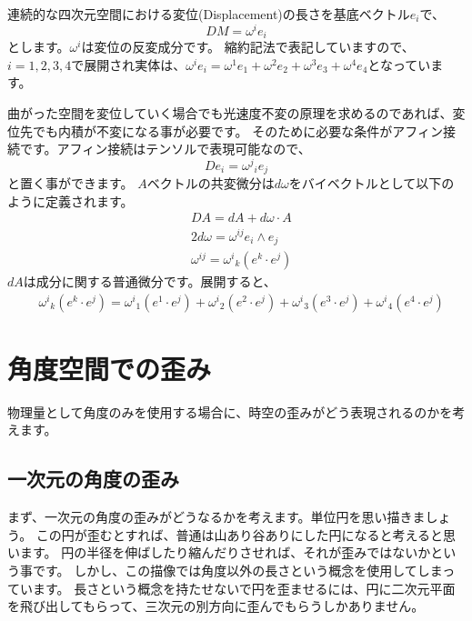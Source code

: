 \documentclass[a4paper,12pt,notitlepage]{jsreport}
\begin{document}
連続的な四次元空間における変位(Displacement)の長さを基底ベクトル$e_i$で、
\begin{equation}
  DM=\omega^ie_i
\end{equation}
とします。$\omega^i$は変位の反変成分です。
縮約記法で表記していますので、$i=1,2,3,4$で展開され実体は、$\omega^ie_i=\omega^1e_1+\omega^2e_2+\omega^3e_3+\omega^4e_4$となっています。

曲がった空間を変位していく場合でも光速度不変の原理を求めるのであれば、変位先でも内積が不変になる事が必要です。
そのために必要な条件がアフィン接続です。アフィン接続はテンソルで表現可能なので、
\begin{equation}
  De_i={\omega^j}_ie_j
\end{equation}
と置く事ができます。
$A$ベクトルの共変微分は$d\omega$をバイベクトルとして以下のように定義されます。
\begin{equation}
  \begin{split}
    &DA=dA+d\omega\cdot A\\
    &2d\omega=\omega^{ij}e_i\wedge e_j\\
    &\omega^{ij}={\omega^i}_k(e^k\cdot e^j)
  \end{split}
\end{equation}
$dA$は成分に関する普通微分です。展開すると、
\begin{equation}
  \begin{split}
    &{\omega^i}_k(e^k\cdot e^j)={\omega^i}_1(e^1\cdot e^j)+{\omega^i}_2(e^2\cdot e^j)+{\omega^i}_3(e^3\cdot e^j)+{\omega^i}_4(e^4\cdot e^j)
  \end{split}
\end{equation}



\chapter{角度空間での歪み}

物理量として角度のみを使用する場合に、時空の歪みがどう表現されるのかを考えます。

\section{一次元の角度の歪み}

まず、一次元の角度の歪みがどうなるかを考えます。単位円を思い描きましょう。
この円が歪むとすれば、普通は山あり谷ありにした円になると考えると思います。
円の半径を伸ばしたり縮んだりさせれば、それが歪みではないかという事です。
しかし、この描像では角度以外の長さという概念を使用してしまっています。
長さという概念を持たせないで円を歪ませるには、円に二次元平面を飛び出してもらって、三次元の別方向に歪んでもらうしかありません。
\end{document}
